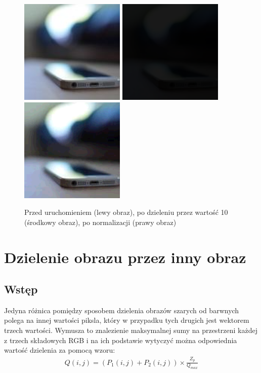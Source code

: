 \documentclass[a4paper,12pt]{book}
\begin{document}
\begin{figure}[H]
	\caption{Przed uruchomieniem (lewy obraz), po dzieleniu przez wartość 10 (środkowy obraz), po normalizacji (prawy obraz)}
	\includegraphics[width=5cm, height=5cm]{phone-unmodified.jpg}
	\includegraphics[width=5cm, height=5cm]{3-5/divide-color-const-phone-10.png}
	\includegraphics[width=5cm, height=5cm]{3-5/divide-color-const-phone-10-norm.png}
\end{figure}

\section{Dzielenie obrazu przez inny obraz}
\subsection*{Wstęp}
Jedyna różnica pomiędzy sposobem dzielenia obrazów szarych od barwnych polega na innej wartości piksla, który w przypadku tych drugich jest wektorem trzech wartości. Wymusza to znalezienie maksymalnej sumy na przestrzeni każdej z trzech składowych RGB i na ich podstawie wytyczyć można odpowiednia wartość dzielenia za pomocą wzoru: 
\begin{gather}
	Q(i,j) = (P_1(i,j) + P_2(i,j)) \times \frac{Z_p}{Q_{max}}
\end{gather}
\end{document}
